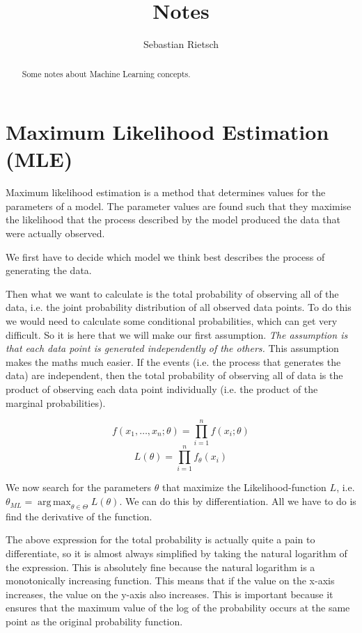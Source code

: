 \documentclass{scrartcl}
\DeclareMathOperator*{\argmax}{arg\,max}
\begin{document}
\title{Notes}
\author{Sebastian Rietsch}

\maketitle
\begin{abstract}
Some notes about Machine Learning concepts.
\end{abstract}
\tableofcontents 
\newpage

\section[Maximum Likelihood Estimation (MLE)]{Maximum Likelihood Estimation (MLE)\cite{mle-wikipedia} \cite{mle-tds}}
Maximum likelihood estimation is a method that determines values for the parameters of a model. The parameter values are found such that they maximise the likelihood that the process described by the model produced the data that were actually observed.

We first have to decide which model we think best describes the process of generating the data.

Then what we want to calculate is the total probability of observing all of the data, i.e. the joint probability distribution of all observed data points. To do this we would need to calculate some conditional probabilities, which can get very difficult. So it is here that we will make our first assumption. \textit{The assumption is that each data point is generated independently of the others.} This assumption makes the maths much easier. If the events (i.e. the process that generates the data) are independent, then the total probability of observing all of data is the product of observing each data point individually (i.e. the product of the marginal probabilities).

$$f(x_1, \dots, x_n; \theta) = \prod_{i=1}^n f(x_i; \theta)$$
$$L(\theta) = \prod_{i=1}^n f_{\theta}(x_i)$$

We now search for the parameters $\theta$ that maximize the Likelihood-function $L$, i.e. $\theta_{ML} = \argmax_{\theta \in \Theta} L(\theta)$. We can do this by differentiation. All we have to do is find the derivative of the function.

The above expression for the total probability is actually quite a pain to differentiate, so it is almost always simplified by taking the natural logarithm of the expression. This is absolutely fine because the natural logarithm is a monotonically increasing function. This means that if the value on the x-axis increases, the value on the y-axis also increases. This is important because it ensures that the maximum value of the log of the probability occurs at the same point as the original probability function.
\end{document}
